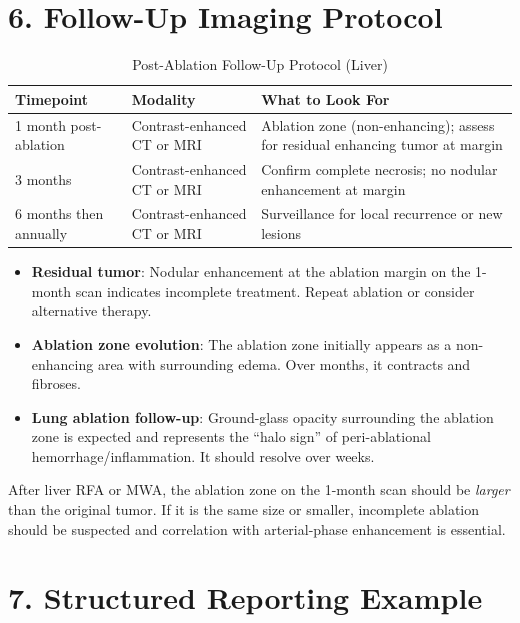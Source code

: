 \section{6. Follow-Up Imaging Protocol}

\begin{table}[h]
\centering
\begin{tabular}{@{}p{}p{}p{}@{}}
\hline
\textbf{Timepoint} & \textbf{Modality} & \textbf{What to Look For} \\
\hline
1 month post-ablation & Contrast-enhanced CT or MRI & Ablation zone (non-enhancing); assess for residual enhancing tumor at margin \\
3 months & Contrast-enhanced CT or MRI & Confirm complete necrosis; no nodular enhancement at margin \\
6 months then annually & Contrast-enhanced CT or MRI & Surveillance for local recurrence or new lesions \\
\hline
\end{tabular}
\caption{Post-Ablation Follow-Up Protocol (Liver)}
\end{table}

\begin{itemize}
  \item \textbf{Residual tumor}: Nodular enhancement at the ablation margin on the 1-month scan indicates incomplete treatment. Repeat ablation or consider alternative therapy.
  \item \textbf{Ablation zone evolution}: The ablation zone initially appears as a non-enhancing area with surrounding edema. Over months, it contracts and fibroses.
  \item \textbf{Lung ablation follow-up}: Ground-glass opacity surrounding the ablation zone is expected and represents the ``halo sign'' of peri-ablational hemorrhage/inflammation. It should resolve over weeks.
\end{itemize}

\begin{pearlbox}
After liver RFA or MWA, the ablation zone on the 1-month scan should be \textit{larger} than the original tumor. If it is the same size or smaller, incomplete ablation should be suspected and correlation with arterial-phase enhancement is essential.
\end{pearlbox}


\section{7. Structured Reporting Example}

